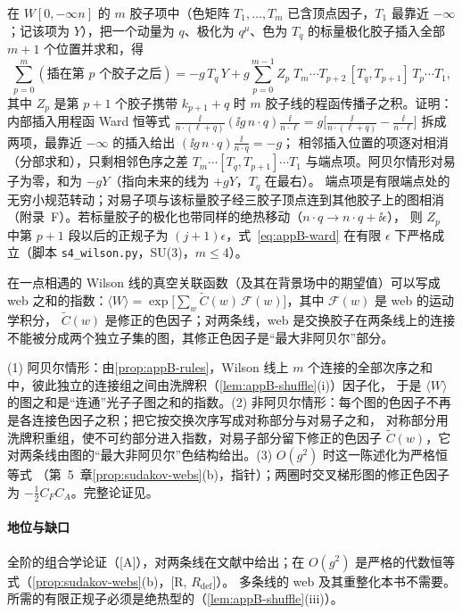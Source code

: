 \begin{remark}\label{rem:appB-ward}
在 $W[0,-\infty n]$ 的 $m$ 胶子项中（色矩阵 $T_1,\dots,T_m$ 已含顶点因子，$T_1$ 最靠近 $-\infty$；记该项为 $Y$），把一个动量为 $q$、极化为 $q^\mu$、色为 $T_q$ 的标量极化胶子插入全部 $m+1$ 个位置并求和，得
\begin{equation}\label{eq:appB-ward}
\sum_{p=0}^{m}(\text{插在第 }p\text{ 个胶子之后})=-g\,T_q\,Y+g\sum_{p=0}^{m-1}Z_p\;T_m\cdots T_{p+2}\,[T_q,T_{p+1}]\,T_p\cdots T_1 ,
\end{equation}
其中 $Z_p$ 是第 $p+1$ 个胶子携带 $k_{p+1}+q$ 时 $m$ 胶子线的程函传播子之积。证明：内部插入用程函 Ward 恒等式
$\frac{\ii}{n\cdot(\ell+q)}(\ii g\,n\cdot q)\frac{\ii}{n\cdot\ell}=g\big[\frac{\ii}{n\cdot(\ell+q)}-\frac{\ii}{n\cdot\ell}\big]$ 拆成两项，最靠近 $-\infty$ 的插入给出 $(\ii g\,n\cdot q)\frac{\ii}{n\cdot q}=-g$；
相邻插入位置的项逐对相消（分部求和），只剩相邻色序之差 $T_m\cdots[T_q,T_{p+1}]\cdots T_1$ 与端点项。阿贝尔情形对易子为零，和为 $-gY$（指向未来的线为 $+gY$，$T_q$ 在最右）。
端点项是有限端点处的无穷小规范转动；对易子项与该标量胶子经三胶子顶点连到其他胶子上的图相消（附录~F）。若标量胶子的极化也带同样的绝热移动（$n\cdot q\to n\cdot q+\ii\epsilon$），
则 $Z_p$ 中第 $p+1$ 段以后的正规子为 $(j+1)\epsilon$，式~\eqref{eq:appB-ward} 在有限 $\epsilon$ 下严格成立（脚本 \texttt{s4\_wilson.py}，SU(3)，$m\le4$）。
\end{remark}

\begin{proposition}\label{prop:appB-webs}
在一点相遇的 Wilson 线的真空关联函数（及其在背景场中的期望值）可以写成 web 之和的指数：$\langle W\rangle=\exp\big[\sum_w\tilde C(w)\,\mathcal F(w)\big]$，其中 $\mathcal F(w)$ 是 web 的运动学积分，
$\tilde C(w)$ 是修正的色因子；对两条线，web 是交换胶子在两条线上的连接不能被分成两个独立子集的图，其修正色因子是“最大非阿贝尔”部分\cite{Gatheral1983,FrenkelTaylor1984}。
\end{proposition}

\begin{proofsketch}
(1) 阿贝尔情形：由\cref{prop:appB-rules}，Wilson 线上 $m$ 个连接的全部次序之和中，彼此独立的连接组之间由洗牌积（\cref{lem:appB-shuffle}(i)）因子化，
于是 $\langle W\rangle$ 的图之和是“连通”光子子图之和的指数。(2) 非阿贝尔情形：每个图的色因子不再是各连接色因子之积；把它按交换次序写成对称部分与对易子之和，
对称部分用洗牌积重组，使不可约部分进入指数，对易子部分留下修正的色因子 $\tilde C(w)$，它对两条线由图的“最大非阿贝尔”色结构给出。(3) $O(g^2)$ 时这一陈述化为严格恒等式
（第~5~章\cref{prop:sudakov-webs}(b)，指针）；两圈时交叉梯形图的修正色因子为 $-\frac12C_FC_A$。完整论证见\cite{Gatheral1983,FrenkelTaylor1984}。
\end{proofsketch}

\paragraph{地位与缺口}全阶的组合学论证（[A]），对两条线在文献中给出\cite{Gatheral1983,FrenkelTaylor1984}；在 $O(g^2)$ 是严格的代数恒等式（\cref{prop:sudakov-webs}(b)，[R, $R_{\mathrm{def}}$]）。
多条线的 web 及其重整化本书不需要。所需的有限正规子必须是绝热型的（\cref{lem:appB-shuffle}(iii)）。
